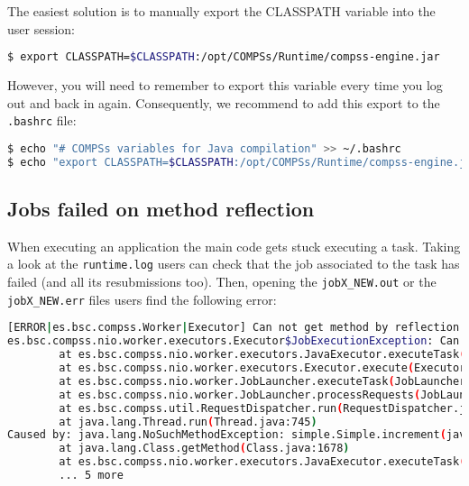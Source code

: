 The easiest solution is to manually export the CLASSPATH variable into the user session:

\begin{lstlisting}[language=bash]
$ export CLASSPATH=$CLASSPATH:/opt/COMPSs/Runtime/compss-engine.jar
\end{lstlisting}

However, you will need to remember to export this variable every time you log out and back in again. Consequently, we recommend to 
add this export to the \texttt{.bashrc} file:

\begin{lstlisting}[language=bash]
$ echo "# COMPSs variables for Java compilation" >> ~/.bashrc
$ echo "export CLASSPATH=$CLASSPATH:/opt/COMPSs/Runtime/compss-engine.jar" >> ~/.bashrc
\end{lstlisting}



%
%
\subsection{Jobs failed on method reflection}

When executing an application the main code gets stuck executing a task. Taking a look at the \texttt{runtime.log} users can check
that the job associated to the task has failed (and all its resubmissions too). Then, opening the \texttt{jobX\_NEW.out} or the
\texttt{jobX\_NEW.err} files users find the following error:

\begin{lstlisting}[language=bash]
[ERROR|es.bsc.compss.Worker|Executor] Can not get method by reflection
es.bsc.compss.nio.worker.executors.Executor$JobExecutionException: Can not get method by reflection
        at es.bsc.compss.nio.worker.executors.JavaExecutor.executeTask(JavaExecutor.java:142)
        at es.bsc.compss.nio.worker.executors.Executor.execute(Executor.java:42)
        at es.bsc.compss.nio.worker.JobLauncher.executeTask(JobLauncher.java:46)
        at es.bsc.compss.nio.worker.JobLauncher.processRequests(JobLauncher.java:34)
        at es.bsc.compss.util.RequestDispatcher.run(RequestDispatcher.java:46)
        at java.lang.Thread.run(Thread.java:745)
Caused by: java.lang.NoSuchMethodException: simple.Simple.increment(java.lang.String)
        at java.lang.Class.getMethod(Class.java:1678)
        at es.bsc.compss.nio.worker.executors.JavaExecutor.executeTask(JavaExecutor.java:140)
        ... 5 more
\end{lstlisting}

